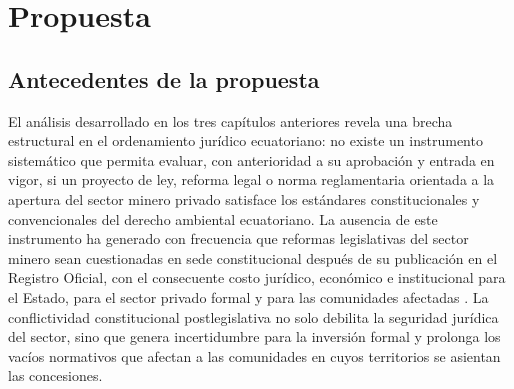 
\chapter{Propuesta}

\section{Antecedentes de la propuesta}

El análisis desarrollado en los tres capítulos anteriores revela una brecha estructural en el ordenamiento jurídico ecuatoriano: no existe un instrumento sistemático que permita evaluar, con anterioridad a su aprobación y entrada en vigor, si un proyecto de ley, reforma legal o norma reglamentaria orientada a la apertura del sector minero privado satisface los estándares constitucionales y convencionales del derecho ambiental ecuatoriano. La ausencia de este instrumento ha generado con frecuencia que reformas legislativas del sector minero sean cuestionadas en sede constitucional después de su publicación en el Registro Oficial, con el consecuente costo jurídico, económico e institucional para el Estado, para el sector privado formal y para las comunidades afectadas \parencite{sanchez_romero_et_al_2026,primicias_demandas_2026}. La conflictividad constitucional postlegislativa no solo debilita la seguridad jurídica del sector, sino que genera incertidumbre para la inversión formal y prolonga los vacíos normativos que afectan a las comunidades en cuyos territorios se asientan las concesiones.

